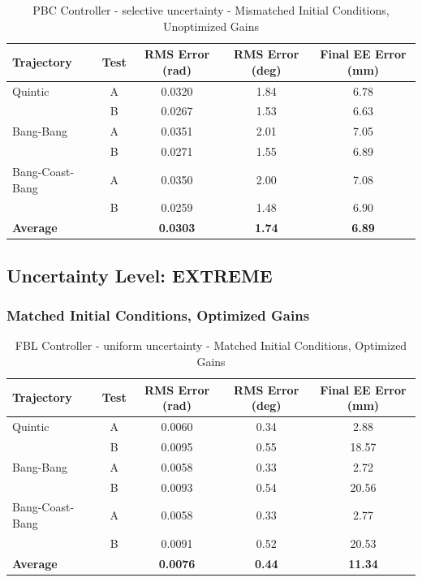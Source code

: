 \documentclass[11pt,a4paper]{article}
\begin{document}
\begin{table}[H]
\centering
\caption{PBC Controller - selective uncertainty - Mismatched Initial Conditions, Unoptimized Gains}
\begin{tabular}{lcccc}
\toprule
Trajectory & Test & RMS Error (rad) & RMS Error (deg) & Final EE Error (mm) \\
\midrule
Quintic & A & 0.0320 & 1.84 & 6.78 \\
 & B & 0.0267 & 1.53 & 6.63 \\
\midrule
Bang-Bang & A & 0.0351 & 2.01 & 7.05 \\
 & B & 0.0271 & 1.55 & 6.89 \\
\midrule
Bang-Coast-Bang & A & 0.0350 & 2.00 & 7.08 \\
 & B & 0.0259 & 1.48 & 6.90 \\
\midrule
\textbf{Average} & & \textbf{0.0303} & \textbf{1.74} & \textbf{6.89} \\
\bottomrule
\end{tabular}
\end{table}

\subsection{Uncertainty Level: EXTREME}

\subsubsection{Matched Initial Conditions, Optimized Gains}

\begin{table}[H]
\centering
\caption{FBL Controller - uniform uncertainty - Matched Initial Conditions, Optimized Gains}
\begin{tabular}{lcccc}
\toprule
Trajectory & Test & RMS Error (rad) & RMS Error (deg) & Final EE Error (mm) \\
\midrule
Quintic & A & 0.0060 & 0.34 & 2.88 \\
 & B & 0.0095 & 0.55 & 18.57 \\
\midrule
Bang-Bang & A & 0.0058 & 0.33 & 2.72 \\
 & B & 0.0093 & 0.54 & 20.56 \\
\midrule
Bang-Coast-Bang & A & 0.0058 & 0.33 & 2.77 \\
 & B & 0.0091 & 0.52 & 20.53 \\
\midrule
\textbf{Average} & & \textbf{0.0076} & \textbf{0.44} & \textbf{11.34} \\
\bottomrule
\end{tabular}
\end{table}
\end{document}
